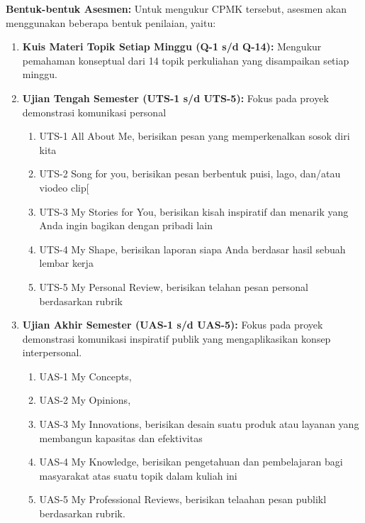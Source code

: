 \documentclass[
  letterpaper,
  DIV=11,
  numbers=noendperiod]{scrreprt}
\providecommand{\tightlist}{%
  \setlength{\itemsep}{0pt}\setlength{\parskip}{0pt}}
\begin{document}
\textbf{Bentuk-bentuk Asesmen:} Untuk mengukur CPMK tersebut, asesmen
akan menggunakan beberapa bentuk penilaian, yaitu:

\begin{enumerate}
\def\labelenumi{\arabic{enumi}.}
\tightlist
\item
  \textbf{Kuis Materi Topik Setiap Minggu (Q-1 s/d Q-14):} Mengukur
  pemahaman konseptual dari 14 topik perkuliahan yang disampaikan setiap
  minggu.
\item
  \textbf{Ujian Tengah Semester (UTS-1 s/d UTS-5):} Fokus pada proyek
  demonstrasi komunikasi personal

  \begin{enumerate}
  \def\labelenumii{\arabic{enumii}.}
  \tightlist
  \item
    UTS-1 All About Me, berisikan pesan yang memperkenalkan sosok diri
    kita
  \item
    UTS-2 Song for you, berisikan pesan berbentuk puisi, lago, dan/atau
    viodeo clip{[}
  \item
    UTS-3 My Stories for You, berisikan kisah inspiratif dan menarik
    yang Anda ingin bagikan dengan pribadi lain
  \item
    UTS-4 My Shape, berisikan laporan siapa Anda berdasar hasil sebuah
    lembar kerja
  \item
    UTS-5 My Personal Review, berisikan telahan pesan personal
    berdasarkan rubrik
  \end{enumerate}
\item
  \textbf{Ujian Akhir Semester (UAS-1 s/d UAS-5):} Fokus pada proyek
  demonstrasi komunikasi inspiratif publik yang mengaplikasikan konsep
  interpersonal.

  \begin{enumerate}
  \def\labelenumii{\arabic{enumii}.}
  \tightlist
  \item
    UAS-1 My Concepts,
  \item
    UAS-2 My Opinions,
  \item
    UAS-3 My Innovations, berisikan desain suatu produk atau layanan
    yang membangun kapasitas dan efektivitas
  \item
    UAS-4 My Knowledge, berisikan pengetahuan dan pembelajaran bagi
    masyarakat atas suatu topik dalam kuliah ini
  \item
    UAS-5 My Professional Reviews, berisikan telaahan pesan publikl
    berdasarkan rubrik.
  \end{enumerate}
\end{enumerate}
\end{document}
